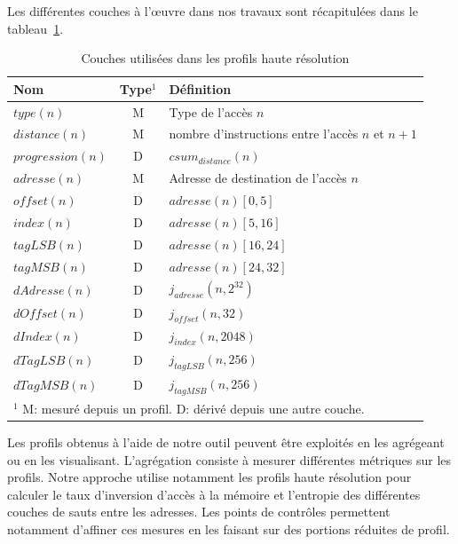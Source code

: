 Les différentes couches à l'œuvre dans nos travaux sont récapitulées dans le tableau~\ref{table:couches}.

\begin{table}[h!]
\centering
\renewcommand{\arraystretch}{1.3}
\caption{\label{table:couches} Couches utilisées dans les profils haute résolution}
\begin{tabular}{@{}l c l@{}}
\toprule
\textbf{Nom} & \textbf{Type}$^1$ & \textbf{Définition} \\
\midrule
$type(n)$ & M & Type de l'accès $n$ \\
\midrule
$distance(n)$ & M & nombre d'instructions entre l'accès $n$ et $n + 1$ \\
$progression(n)$ & D & $csum_{distance}(n)$ \\
\midrule
$adresse(n)$ & M & Adresse de destination de l'accès $n$  \\
$offset(n)$  & D & $adresse(n)[0,5]$ \\
$index(n)$   & D & $adresse(n)[5,16]$\\
$tagLSB(n)$  & D & $adresse(n)[16,24]$\\
$tagMSB(n)$  & D & $adresse(n)[24,32]$\\
\midrule
$dAdresse(n)$ & D & $j_{adresse}(n, 2^{32})$\\
$dOffset(n)$ & D & $j_{offset}(n, 32)$\\
$dIndex(n)$ & D & $j_{index}(n, 2048)$\\
$dTagLSB(n)$ & D & $j_{tagLSB}(n, 256)$\\
$dTagMSB(n)$ & D & $j_{tagMSB}(n, 256)$\\
\bottomrule
\multicolumn{3}{l}{\footnotesize{$^1$ M: mesuré depuis un profil. D: dérivé depuis une autre couche.}}
\end{tabular}
\end{table}

Les profils obtenus à l'aide de notre outil peuvent être exploités en les agrégeant ou en les visualisant.
L'agrégation consiste à mesurer différentes métriques sur les profils.
Notre approche utilise notamment les profils haute résolution pour calculer le taux d'inversion d'accès à la mémoire et l'entropie des différentes couches de sauts entre les adresses.
Les points de contrôles permettent notamment d'affiner ces mesures en les faisant sur des portions réduites de profil.

